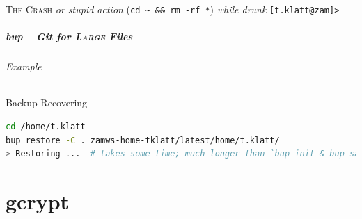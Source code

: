 \documentclass[english,hyperref={pdfpagelabels=false},aspectratio=169]{beamer}
\begin{document}
{
\begin{frame}
  \centering
  \color{white}
  {\Huge \textsc{The Crash}}
  \vfill
  {\tiny\emph{or stupid action} {\color{fzjgray50}(\texttt{cd \textasciitilde~\&\& rm -rf *})} \emph{while drunk}}
  \vfill
  \color{green}
  \texttt{[t.klatt@zam]>\textunderscore}
\end{frame}
}

\begin{frame}[fragile]
  \frametitle{bup -- Git for \textsc{Large} Files}
  \framesubtitle{Example}
  \begin{block}{Backup Recovering}
    \vspace{-0.75em}
    \begin{lstlisting}[language=zsh]
cd /home/t.klatt
bup restore -C . zamws-home-tklatt/latest/home/t.klatt/
> Restoring ...  # takes some time; much longer than `bup init & bup save`
    \end{lstlisting}
    \vspace{-0.75em}
  \end{block}
\end{frame}



\part{gcrypt}
\makepart
\end{document}
